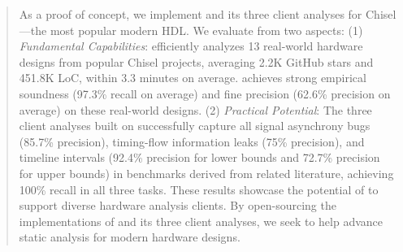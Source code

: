 \begin{abstract}
As a proof of concept, we implement \tia and its three client analyses for Chisel---the most popular modern HDL.
We evaluate \tia from two aspects:
(1) \emph{Fundamental Capabilities}:
\tia efficiently analyzes 13 real-world hardware designs from popular Chisel projects, averaging 2.2K GitHub stars and 451.8K LoC, within 3.3 minutes on average.
\tia achieves strong empirical soundness (97.3\% recall on average) and fine precision (62.6\% precision on average) on these real-world designs.
(2) \emph{Practical Potential}:
The three client analyses built on \tia successfully capture all signal asynchrony bugs (85.7\% precision), timing-flow information leaks (75\% precision), and timeline intervals (92.4\% precision for lower bounds and 72.7\% precision for upper bounds) in benchmarks derived from related literature, achieving 100\% recall in all three tasks.
These results showcase the potential of \tia to support diverse hardware analysis clients.
By open-sourcing the implementations of \tia and its three client analyses, we seek to help advance static analysis for modern hardware designs.
\end{abstract}

